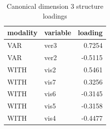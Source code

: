 \begin{table}
\caption{Canonical dimension 3 structure loadings}
\label{tab:cca_dimension_3_loadings}
\begin{tabular}{llr}
\toprule
modality & variable & loading \\
\midrule
VAR & ver3 & 0.7254 \\
VAR & ver2 & -0.5115 \\
WITH & vis2 & 0.5461 \\
WITH & vis7 & 0.3256 \\
WITH & vis6 & -0.3145 \\
WITH & vis5 & -0.3158 \\
WITH & vis4 & -0.4477 \\
\bottomrule
\end{tabular}
\end{table}
